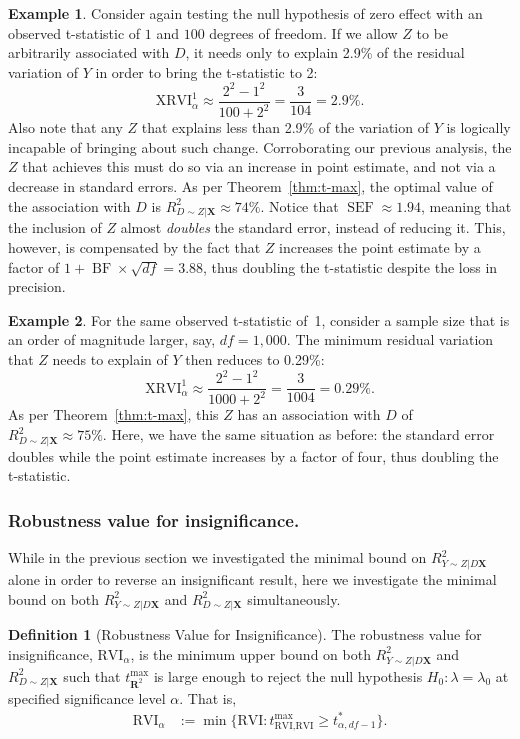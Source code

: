 \documentclass[sts]{imsart}
\theoremstyle{plain}
\theoremstyle{definition}
\newtheorem{example}{Example}
\newtheorem{definition}{Definition}
\newcommand{\df}{df}
\DeclareMathOperator{\SEF}{\text{SEF}}
\DeclareMathOperator{\BF}{\text{BF}}
\newcommand{\tmax}{t_{\boldsymbol{R}^2}^{\max}}
\newcommand{\Ry}{R^2_{Y\sim Z | D\mathbf{X}}}
\newcommand{\Rd}{R^2_{D\sim Z | \mathbf{X}}}
\newcommand{\tstar}{t^*_{\alpha, \df-1}}
\newcommand{\XRVI}{\text{XRVI}}
\newcommand{\RVI}{\text{RVI}}
\begin{document}
\begin{example}
\label{ex:tof1}
    Consider again testing the null hypothesis of zero effect with an observed t-statistic of $1$ and $100$ degrees of freedom. If we allow $Z$ to be arbitrarily associated with $D$, it needs only to explain 2.9\% of the residual variation of $Y$ in order to bring the t-statistic to 2:
    $$
    \XRVI^{1}_{\alpha} \approx \frac{2^2-1^2}{100 + 2^2} = \frac{3}{104} = 2.9\%.
    $$
    Also note that any $Z$ that explains less than 2.9\% of the variation of $Y$ is logically incapable of bringing about  such change. Corroborating our previous analysis, the $Z$ that achieves this must do  so via an increase in point estimate, and not via a decrease in standard errors. 
    As per Theorem~\ref{thm:t-max}, the optimal value of the association with $D$ is $\Rd\approx 74\%$. Notice that $\SEF \approx 1.94$, meaning that the inclusion of $Z$ almost \emph{doubles} the standard error, instead of reducing it. This, however, is compensated by the fact that $Z$ increases the point estimate by a factor of $1+\BF \times \sqrt{\df} = 3.88$, thus doubling the t-statistic despite the loss in precision.
        
\end{example}
\begin{example}
\label{ex:tof1df1000}
    For the same observed t-statistic of~1, consider a sample size that is an order of magnitude larger, say, $\df = 1,000$.  The minimum residual variation that $Z$ needs to explain of $Y$ then reduces to 0.29\%:
    $$
    \XRVI^{1}_{\alpha} \approx \frac{2^2-1^2}{1000 + 2^2} = \frac{3}{1004} = 0.29\%.
    $$
    As per Theorem~\ref{thm:t-max}, this $Z$ has an association with $D$ of $\Rd\approx 75\%$. Here, we have the same situation as before: the standard error doubles while the point estimate increases by a factor of four, thus doubling the t-statistic. 
    
\end{example}
%



\subsubsection{Robustness value for insignificance.} While in the previous section we investigated the minimal bound on $\Ry$ alone in order to reverse an insignificant result, here we investigate the minimal bound on both $\Ry$ and $\Rd$ simultaneously.


\begin{definition}[Robustness Value for Insignificance]
The robustness value for insignificance, $\RVI_{\alpha}$, is the minimum upper bound on both $\Ry$ and $\Rd$ such that 
$\tmax$ is large enough to reject the null hypothesis $H_0: \lambda = \lambda_0$ at specified significance level $\alpha$. That is,
    \begin{align*}
        \RVI_{\alpha} &:= \min \{ \RVI:  t_{\RVI,\RVI}^{\max} \geq \tstar \}. 
    \end{align*}
\end{definition}
\end{document}
